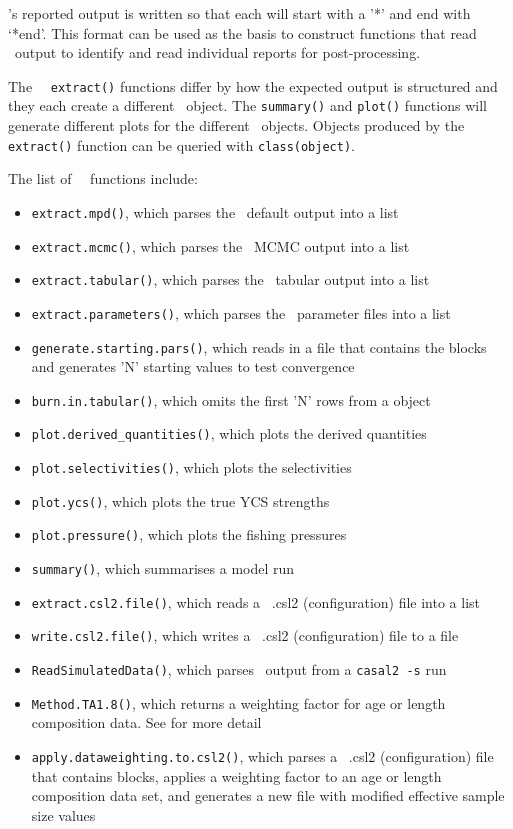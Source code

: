 \CNAME's reported output is written so that each  will start with a '*' and end with `*end'. This format can be used as the basis to construct functions that read \CNAME\ output to identify and read individual reports for post-processing.

The \CNAME\ \R\ \texttt{extract()} functions differ by how the expected output is structured and they each create a different \cname\ object. The \texttt{summary()} and \texttt{plot()} functions will generate different plots for the different \cname\ objects. Objects produced by the \texttt{extract()} function can be queried with \texttt{class(object)}.

The list of \cname\ \R\ functions include:

\begin{itemize}
	\item \texttt{extract.mpd()}, which parses the \CNAME\ default output into a list
	\item \texttt{extract.mcmc()}, which parses the \CNAME\ MCMC output into a list
	\item \texttt{extract.tabular()}, which parses the \CNAME\ tabular output into a list
	\item \texttt{extract.parameters()}, which parses the \CNAME\ parameter files into a list
	\item \texttt{generate.starting.pars()}, which reads in a file that contains the  blocks and generates 'N' starting values to test convergence
	\item \texttt{burn.in.tabular()}, which omits the first 'N' rows from a  object
	\item \texttt{plot.derived\_quantities()}, which plots the derived quantities
	\item \texttt{plot.selectivities()}, which plots the selectivities
	\item \texttt{plot.ycs()}, which plots the true YCS strengths
	\item \texttt{plot.pressure()}, which plots the fishing pressures
	\item \texttt{summary()}, which summarises a model run
	\item \texttt{extract.csl2.file()}, which reads a \CNAME\ .csl2 (configuration) file into a list
	\item \texttt{write.csl2.file()}, which writes a \CNAME\ .csl2 (configuration) file to a file
	\item \texttt{ReadSimulatedData()}, which parses \CNAME\ output from a \texttt{casal2 -s} run
	\item \texttt{Method.TA1.8()}, which returns a weighting factor for age or length composition data. See \cite{francis2011data} for more detail
	\item \texttt{apply.dataweighting.to.csl2()}, which parses a \CNAME\ .csl2 (configuration) file that contains  blocks, applies a weighting factor to an age or length composition data set, and generates a new  file with modified effective sample size values
\end{itemize}

